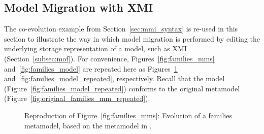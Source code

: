 \subsection{Model Migration with XMI}
\label{subsec:migration_with_xmi}
The co-evolution example from Section~\ref{sec:mmi_syntax} is re-used in this section to illustrate the way in which model migration is performed by editing the underlying storage representation of a model, such as XMI (Section~\ref{subsec:mof}). For convenience, Figures~\ref{fig:families_mms} and~\ref{fig:families_model} are repeated here as Figures~\ref{fig:families_mms_repeated} and~\ref{fig:families_model_repeated}, respectively. Recall that the model (Figure~\ref{fig:families_model_repeated}) conforms to the original metamodel (Figure~\ref{fig:original_families_mm_repeated}).

\begin{figure}[htbp]
	\centering
	\caption[Evolution of a families metamodel, based on the metamodel in \cite{hutn}]{Reproduction of Figure~\ref{fig:families_mms}: Evolution of a families metamodel, based on the metamodel in \cite{hutn}.}
\label{fig:families_mms_repeated}
\end{figure}

